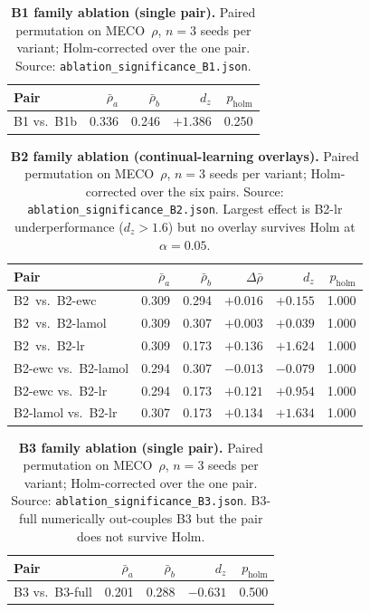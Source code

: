 \begin{table}[!ht]
  \centering
  \small
  \caption{\textbf{B1 family ablation (single pair).} Paired permutation on MECO~$\rho$, $n=3$ seeds per variant; Holm-corrected over the one pair. Source: \texttt{ablation\_significance\_B1.json}.}
  \label{tab:sig_B1}
  \begin{tabular}{lrrrr}
    \toprule
    Pair & $\bar\rho_a$ & $\bar\rho_b$ & $d_z$ & $p_{\mathrm{holm}}$ \\
    \midrule
    B1 vs.\ B1b & 0.336 & 0.246 & $+1.386$ & 0.250 \\
    \bottomrule
  \end{tabular}
\end{table}

\begin{table}[!ht]
  \centering
  \small
  \caption{\textbf{B2 family ablation (continual-learning overlays).} Paired permutation on MECO~$\rho$, $n=3$ seeds per variant; Holm-corrected over the six pairs. Source: \texttt{ablation\_significance\_B2.json}. Largest effect is B2-lr underperformance ($d_z{>}1.6$) but no overlay survives Holm at $\alpha{=}0.05$.}
  \label{tab:sig_B2}
  \begin{tabular}{lrrrrr}
    \toprule
    Pair & $\bar\rho_a$ & $\bar\rho_b$ & $\Delta\bar\rho$ & $d_z$ & $p_{\mathrm{holm}}$ \\
    \midrule
    B2 \,vs.\ B2-ewc      & 0.309 & 0.294 & $+0.016$ & $+0.155$ & 1.000 \\
    B2 \,vs.\ B2-lamol    & 0.309 & 0.307 & $+0.003$ & $+0.039$ & 1.000 \\
    B2 \,vs.\ B2-lr       & 0.309 & 0.173 & $+0.136$ & $+1.624$ & 1.000 \\
    B2-ewc vs.\ B2-lamol  & 0.294 & 0.307 & $-0.013$ & $-0.079$ & 1.000 \\
    B2-ewc vs.\ B2-lr     & 0.294 & 0.173 & $+0.121$ & $+0.954$ & 1.000 \\
    B2-lamol vs.\ B2-lr   & 0.307 & 0.173 & $+0.134$ & $+1.634$ & 1.000 \\
    \bottomrule
  \end{tabular}
\end{table}

\begin{table}[!ht]
  \centering
  \small
  \caption{\textbf{B3 family ablation (single pair).} Paired permutation on MECO~$\rho$, $n=3$ seeds per variant; Holm-corrected over the one pair. Source: \texttt{ablation\_significance\_B3.json}. B3-full numerically out-couples B3 but the pair does not survive Holm.}
  \label{tab:sig_B3}
  \begin{tabular}{lrrrr}
    \toprule
    Pair & $\bar\rho_a$ & $\bar\rho_b$ & $d_z$ & $p_{\mathrm{holm}}$ \\
    \midrule
    B3 vs.\ B3-full & 0.201 & 0.288 & $-0.631$ & 0.500 \\
    \bottomrule
  \end{tabular}
\end{table}

